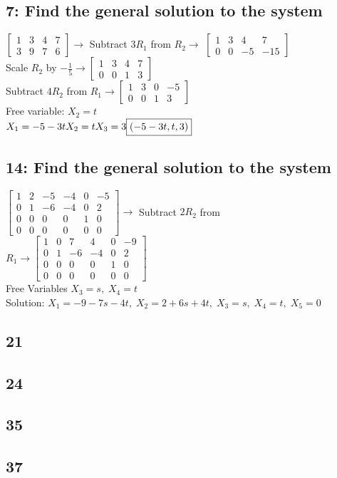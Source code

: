 \documentclass{article}
\begin{document}
\subsection*{7: Find the general solution to the system}
$
\left[\begin{array}{ccc|c}
    1 & 3 & 4 & 7 \\
    3 & 9 & 7 & 6
\end{array}\right]
\rightarrow$ Subtract $3R_1$ from $R_2 \rightarrow$
$
\left[\begin{array}{ccc|c}
    1 & 3 & 4 & 7 \\
    0 & 0 & -5 & -15
\end{array}\right]$ \\[0.1in] Scale $R_2$ by $-\frac{1}{5} \rightarrow
\left[\begin{array}{ccc|c}
    1 & 3 & 4 & 7 \\
    0 & 0 & 1 & 3
\end{array}\right]
$\\[0.1in] Subtract $4R_2$ from $R_1 \rightarrow
\left[\begin{array}{ccc|c}
    1 & 3 & 0 & -5 \\
    0 & 0 & 1 & 3
\end{array}\right]
$ \\[0.1in] Free variable: $X_2 = t$
\\$X_1=-5-3t \\ X_2 = t \\ X_3=3 \\ \boxed{(-5-3t, t, 3)}$ 
\pagebreak
\subsection*{14: Find the general solution to the system}
$\left[\begin{array}{ccccc|c}
    1 & 2 & -5 & -4 & 0 & -5 \\
    0 & 1 & -6 & -4 & 0 & 2 \\
    0 & 0 & 0 & 0 & 1 & 0 \\
    0 & 0 & 0 & 0 & 0 & 0 
\end{array}\right] \rightarrow$ Subtract $2R_2$ from $R_1 \rightarrow
\left[\begin{array}{ccccc|c}
    1 & 0 & 7 & 4 & 0 & -9 \\
    0 & 1 & -6 & -4 & 0 & 2 \\
    0 & 0 & 0 & 0 & 1 & 0 \\
    0 & 0 & 0 & 0 & 0 & 0 
\end{array}\right]
$ \\[0.1in] Free Variables $X_3 = s, \; X_4=t$
\\Solution: $X_1 = -9-7s-4t, \; X_2 = 2+6s+4t, \; X_3 = s, \; X_4 = t, \; X_5 = 0$
\\[1.2mm]
\subsection*{21}
\subsection*{24}
\subsection*{35}
\subsection*{37}
\end{document}
